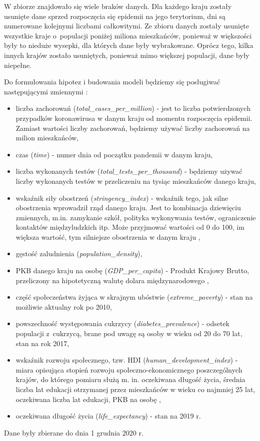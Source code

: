 \documentclass[12pt]{mwbk}
\theoremstyle{plain}
\theoremstyle{definition}
\theoremstyle{definition}
\begin{document}
W zbiorze znajdowało się wiele braków danych. Dla każdego kraju zostały usunięte dane sprzed rozpoczęcia się epidemii na jego terytorium, dni są numerowane kolejnymi liczbami całkowitymi.
Ze zbioru danych zostały usunięte wszystkie kraje o~populacji poniżej miliona mieszkańców, ponieważ w większości były to nieduże wysepki, dla których dane były wybrakowane. Oprócz tego, kilka innych krajów zostało usuniętych, ponieważ mimo większej populacji, dane były niepełne.

Do formułowania hipotez i budowania modeli będziemy się posługiwać następującymi zmiennymi \cite{codebook}:
\begin{itemize}
	\item liczba zachorowań (\textit{total\_cases\_per\_million}) - jest to liczba potwierdzonych przypadków koronawirusa w danym kraju od momentu rozpoczęcia epidemii. Zamiast wartości liczby zachorowań, będziemy używać liczby zachorowań na milion mieszkańców,
	\item czas (\textit{time}) - numer dnia od początku pandemii w danym kraju,
	\item liczba wykonanych testów (\textit{total\_tests\_per\_thousand}) - będziemy używać liczby wykonanych testów w przeliczeniu na tysiąc mieszkańców danego kraju,
	\item wskaźnik siły obostrzeń (\textit{stringency\_index}) - wskaźnik tego, jak silne obostrzenia wprowadził rząd danego kraju. Jest to kombinacja dziewięciu zmiennych, m.in. zamykanie szkół, polityka wykonywania testów, ograniczenie kontaktów międzyludzkich itp. Może przyjmować wartości od 0 do 100, im większa wartość, tym silniejsze obostrzenia w danym kraju \cite{stringency},
	\item gęstość zaludnienia (\textit{population\_density}),
	\item PKB danego kraju na osobę (\textit{GDP\_per\_capita}) - Produkt Krajowy Brutto, przeliczony na hipotetyczną walutę dolara międzynarodowego \cite{dollars},
	\item część społeczeństwa żyjąca w skrajnym ubóstwie (\textit{extreme\_poverty}) - stan na możliwie aktualny rok po 2010,
	\item powszechność występowania cukrzycy (\textit{diabetes\_prevalence}) - odsetek populacji z~cukrzycą, brane pod uwagę są osoby w wieku od 20 do 70 lat, stan na rok 2017,
	\item wskaźnik rozwoju społecznego, tzw. HDI (\textit{human\_development\_index}) -  miara opisująca stopień rozwoju społeczno-ekonomicznego poszczególnych krajów, do którego pomiaru służą m. in. oczekiwana długość życia, średnia liczba lat edukacji otrzymanej przez mieszkańców w wieku co najmniej 25 lat, oczekiwana liczba lat edukacji, PKB na osobę \cite{hdi},
	\item oczekiwana długość życia (\textit{life\_expectancy}) - stan na 2019 r.
	
\end{itemize}
Dane były zbierane do dnia 1 grudnia 2020 r. 
\end{document}
